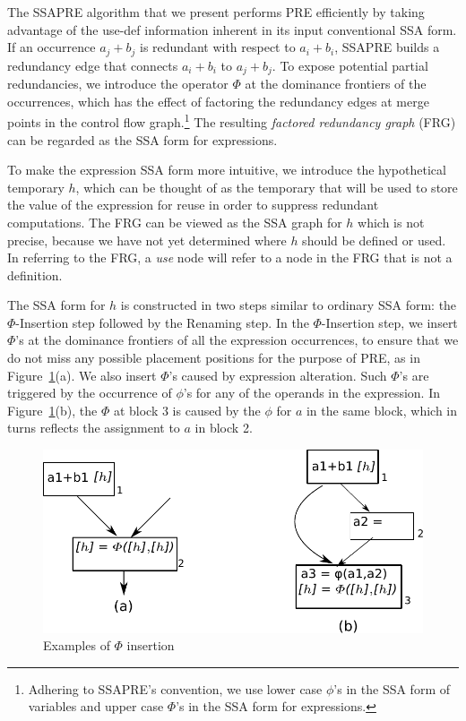 The SSAPRE algorithm that we present performs PRE efficiently by taking 
advantage of the use-def information inherent in its input conventional SSA 
form.  If an occurrence $a_j+b_j$ is redundant with respect to $a_i+b_i$, SSAPRE
builds a redundancy edge that connects $a_i+b_i$ to
$a_j+b_j$.  To expose potential partial redundancies, we introduce the 
operator $\Phi$ at the dominance frontiers of the occurrences, which has the 
effect of factoring the redundancy edges at merge points in the control
flow graph.\footnote{Adhering to SSAPRE's convention, we use lower case 
$\phi$'s in the SSA form of variables and upper case $\Phi$'s
in the SSA form for expressions.} The resulting \emph{factored redundancy 
graph} (FRG) can be regarded as the SSA form for expressions.

To make the expression SSA form more intuitive, we introduce the 
hypothetical temporary $h$,
which can be thought of as the temporary that will be used to store the value
of the expression for reuse in order to suppress redundant computations.
The FRG can be viewed as the SSA graph for $h$ which is not precise,
because we have not yet determined where $h$ should be defined or used.
In referring to the FRG, a \emph{use} node will refer to a node in the FRG
that is not a definition.

The SSA form for $h$ is constructed in two steps similar to ordinary SSA
form: the $\Phi$-Insertion step followed by the Renaming step.  
In the $\Phi$-Insertion 
step, we insert $\Phi$'s at the dominance frontiers of all the expression 
occurrences, to ensure that we do not miss any possible placement positions
for the purpose of PRE, as in Figure~\ref{fig: phi-insertion}(a).
We also insert $\Phi$'s caused by expression alteration.
Such $\Phi$'s are triggered by the occurrence of $\phi$'s
for any of the operands in the expression.
In Figure~\ref{fig: phi-insertion}(b), the $\Phi$ at block 3 is caused by
the $\phi$ for $a$ in the same block, which in turns reflects the
assignment to $a$ in block 2.

\begin{figure}
\centering
\includegraphics[scale=0.45]{fig-phi-insertion.pdf}
\caption{Examples of $\Phi$ insertion}
\label{fig: phi-insertion}
\end{figure}

